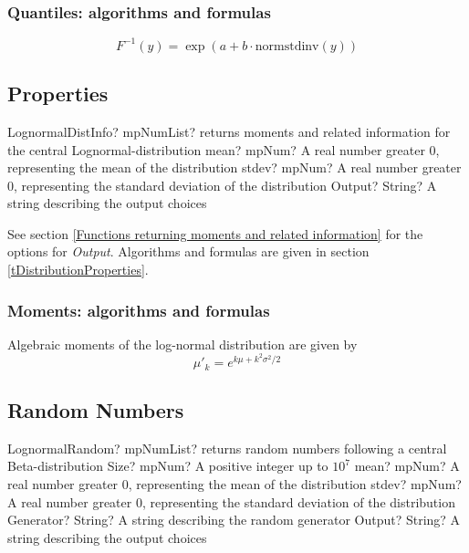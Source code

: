 \subsubsection{Quantiles: algorithms and formulas}

\begin{equation} 
	F^{-1}(y)= \exp(a+b \cdot \text{normstdinv}(y))
\end{equation}



\subsection{Properties}
\label{LognormalDistributionProperties}


\begin{mpFunctionsExtract}
	\mpFunctionThree
	{LognormalDistInfo? mpNumList? returns moments and related information for the central Lognormal-distribution}
	{mean? mpNum? A real number greater 0, representing the mean of the distribution}
	{stdev? mpNum? A real number greater 0, representing the standard deviation of the distribution}
	{Output? String? A string describing the output choices}
\end{mpFunctionsExtract}

\vspace{0.3cm}

See section \ref{Functions returning moments and related information} for the options for {\itshape\sffamily Output}. Algorithms and formulas are given in section \ref{tDistributionProperties}.




\subsubsection{Moments: algorithms and formulas}
Algebraic moments of the log-normal distribution are given by
\begin{equation} 
	\mu'_k= e^{k\mu+k^2\sigma^2 /2}
\end{equation}


\subsection{Random Numbers}
\label{LognormalDistributionRandom}


\begin{mpFunctionsExtract}
	\mpFunctionFive
	{LognormalRandom? mpNumList? returns random numbers following a central Beta-distribution}
	{Size? mpNum? A positive integer up to $10^7$}
	{mean? mpNum? A real number greater 0, representing the mean of the distribution}
	{stdev? mpNum? A real number greater 0, representing the standard deviation of the distribution}
	{Generator? String? A string describing the random generator}
	{Output? String? A string describing the output choices}
\end{mpFunctionsExtract}

